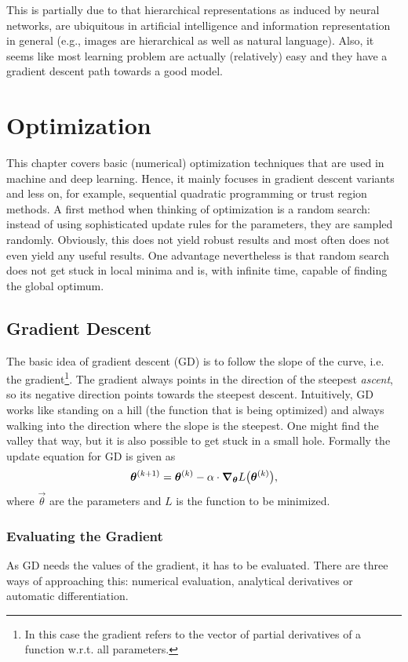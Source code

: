 		This is partially due to that hierarchical representations as induced by neural networks, are ubiquitous in artificial intelligence and information representation in general (e.g., images are hierarchical as well as natural language). Also, it seems like most learning problem are actually (relatively) easy and they have a gradient descent path towards a good model.

\chapter{Optimization}
	\label{c:optimization}

	This chapter covers basic (numerical) optimization techniques that are used in machine and deep learning. Hence, it mainly focuses in gradient descent variants and less on, for example, sequential quadratic programming or trust region methods. A first method when thinking of optimization is a random search: instead of using sophisticated update rules for the parameters, they are sampled randomly. Obviously, this does not yield robust results and most often does not even yield any useful results. One advantage nevertheless is that random search does not get stuck in local minima and is, with infinite time, capable of finding the global optimum.

	\section{Gradient Descent}
		The basic idea of gradient descent (GD) is to follow the slope of the curve, i.e. the gradient\footnote{In this case the gradient refers to the vector of partial derivatives of a function w.r.t. all parameters.}. The gradient always points in the direction of the steepest \emph{ascent}, so its negative direction points towards the steepest descent. Intuitively, GD works like standing on a hill (the function that is being optimized) and always walking into the direction where the slope is the steepest. One might find the valley that way, but it is also possible to get stuck in a small hole. Formally the update equation for GD is given as
		\begin{equation}
			\bm{\theta}^{(k + 1)} = \bm{\theta}^{(k)} - \alpha \cdot \grad_{\bm{\theta}} L\bigl( \bm{\theta}^{(k)} \bigr),
		\end{equation}
		where \(\vec{\theta}\) are the parameters and \(L\) is the function to be minimized.

		\subsection{Evaluating the Gradient}
			As GD needs the values of the gradient, it has to be evaluated. There are three ways of approaching this: numerical evaluation, analytical derivatives or automatic differentiation.


